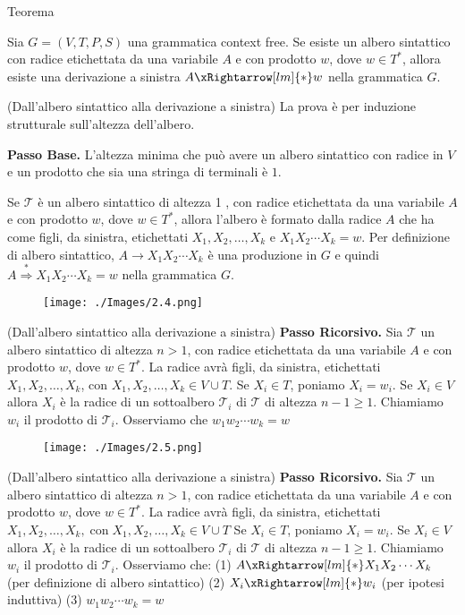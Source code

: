 Teorema

Sia $G=(V, T, P, S)$ una grammatica context free.
Se esiste un albero sintattico con radice etichettata da una variabile $A$ e con prodotto $w$, dove $w \in T^{*}$, allora esiste una derivazione a sinistra $A \xRightarrow[lm]{*} w$ nella grammatica $G$.

\vspace{5mm}

(Dall'albero sintattico alla derivazione a sinistra)
La prova è per induzione strutturale sull'altezza dell'albero.

\textbf{Passo Base.} L'altezza minima che può avere un albero sintattico con radice in $V$ e un prodotto che sia una stringa di terminali è $1 .$

Se $\mathcal{T}$ è un albero sintattico di altezza 1 , con radice etichettata da una variabile $A$ e con prodotto $w$, dove $w \in T^{*}$, allora l'albero è formato dalla radice $A$ che ha come figli, da sinistra, etichettati $X_{1}, X_{2}, \ldots, X_{k}$ e $X_{1} X_{2} \cdots X_{k}=w$.
Per definizione di albero sintattico, $A \rightarrow X_{1} X_{2} \cdots X_{k}$ è una produzione in $G$ e quindi $A \stackrel{*}{\Rightarrow} X_{1} X_{2} \cdots X_{k}=w$ nella grammatica $G$.

\begin{figure}[hbpt!]
    \centering
    \texttt{[image: ./Images/2.4.png]}
\end{figure}
\FloatBarrier

(Dall'albero sintattico alla derivazione a sinistra)
\textbf{Passo Ricorsivo.} Sia $\mathcal{T}$ un albero sintattico di altezza $n>1$, con radice etichettata da una variabile $A$ e con prodotto $w$, dove $w \in T^{*}$. La radice avrà figli, da sinistra, etichettati $X_{1}, X_{2}, \ldots, X_{k}$, con $X_{1}, X_{2}, \ldots, X_{k} \in V \cup T$.
Se $X_{i} \in T$, poniamo $X_{i}=w_{i}$. Se $X_{i} \in V$ allora $X_{i}$ è la radice di un sottoalbero $\mathcal{T}_{i}$ di $\mathcal{T}$ di altezza $n-1 \geq 1$. Chiamiamo $w_{i}$ il prodotto di $\mathcal{T}_{i}$.
Osserviamo che $w_{1} w_{2} \cdots w_{k}=w$


\begin{figure}[hbpt!]
    \centering
    \texttt{[image: ./Images/2.5.png]}
\end{figure}
\FloatBarrier

(Dall'albero sintattico alla derivazione a sinistra)
\textbf{Passo Ricorsivo.} Sia $\mathcal{T}$ un albero sintattico di altezza $n>1$, con radice etichettata da una variabile $A$ e con prodotto $w$, dove $w \in T^{*}$. La radice avrà figli, da sinistra, etichettati $X_{1}, X_{2}, \ldots, X_{k}, \operatorname{con} X_{1}, X_{2}, \ldots, X_{k} \in V \cup T$
Se $X_{i} \in T$, poniamo $X_{i}=w_{i} .$ Se $X_{i} \in V$ allora $X_{i}$ è la radice di un sottoalbero $\mathcal{T}_{i}$ di $\mathcal{T}$ di altezza $n-1 \geq 1$. Chiamiamo $w_{i}$ il prodotto di $\mathcal{T}_{i}$.
Osserviamo che:
(1) $A \xRightarrow[lm]{*} X_{1} X_{2} \cdots X_{k}$ (per definizione di albero sintattico)
(2) $X_{i} \xRightarrow[lm]{*} w_{i}$ (per ipotesi induttiva)
(3) $w_{1} w_{2} \cdots w_{k}=w$

